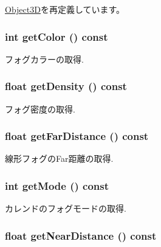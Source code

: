 \hyperlink{classm3g_1_1Object3D_a25110dac934f867b83b73ad4741a0f4}{Object3D}を再定義しています。\hypertarget{classm3g_1_1Fog_4cfa1931c265ec3412fe3f6408a1b4f5}{
\subsubsection[{getColor}]{\setlength{\rightskip}{0pt plus 5cm}int getColor () const}}
\label{classm3g_1_1Fog_4cfa1931c265ec3412fe3f6408a1b4f5}


フォグカラーの取得. \hypertarget{classm3g_1_1Fog_31deef556a6aa5e519d3c79bd9c383c0}{
\subsubsection[{getDensity}]{\setlength{\rightskip}{0pt plus 5cm}float getDensity () const}}
\label{classm3g_1_1Fog_31deef556a6aa5e519d3c79bd9c383c0}


フォグ密度の取得. \hypertarget{classm3g_1_1Fog_90df17252a921929fce6a5e92aed4021}{
\subsubsection[{getFarDistance}]{\setlength{\rightskip}{0pt plus 5cm}float getFarDistance () const}}
\label{classm3g_1_1Fog_90df17252a921929fce6a5e92aed4021}


線形フォグのFar距離の取得. \hypertarget{classm3g_1_1Fog_d4ce4524e4751fe5e3cfb8c270347d54}{
\subsubsection[{getMode}]{\setlength{\rightskip}{0pt plus 5cm}int getMode () const}}
\label{classm3g_1_1Fog_d4ce4524e4751fe5e3cfb8c270347d54}


カレンドのフォグモードの取得. \hypertarget{classm3g_1_1Fog_cd7a642e43bf99b0e1c5c24d3c6424a2}{
\subsubsection[{getNearDistance}]{\setlength{\rightskip}{0pt plus 5cm}float getNearDistance () const}}
\label{classm3g_1_1Fog_cd7a642e43bf99b0e1c5c24d3c6424a2}


